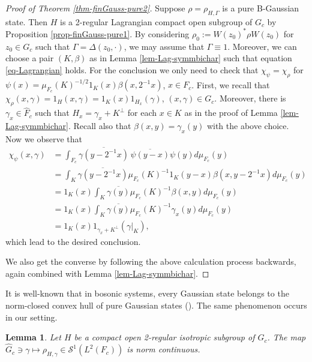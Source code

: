 \documentclass[12pt,reqno]{amsart}
\newtheorem{lem}[thm]{Lemma}
\theoremstyle{definition}
\theoremstyle{definition}
\theoremstyle{definition}
\numberwithin{thm}{section}
\numberwithin{equation}{section}
\newcommand{\mc}[1]{\mathcal #1}
\newcommand{\wh}[1]{\widehat{#1}}
\begin{document}
\begin{proof}[Proof of Theorem \ref{thm-finGauss-pure2}]
Suppose $\rho=\rho_{H,\Gamma}$ is a pure B-Gaussian state. Then $H$ is a 2-regular Lagrangian compact open subgroup of $G_c$ by Proposition \ref{prop-finGauss-pure1}. By considering $\rho_0:=W(z_0)^*\rho W(z_0)$ for $z_0\in G_c$ such that $\Gamma=\Delta(z_0,\cdot)$, we may assume that $\Gamma\equiv 1$. Moreover, we can choose a pair $(K,\beta)$ as in Lemma \ref{lem-Lag-symmbichar} such that equation \eqref{eq-Lagrangian} holds.
For the conclusion we only need to check that $\chi_{\psi} = \chi_\rho$ for $\psi(x) = \mu_{F_c}(K)^{-1/2}1_K(x)\beta(x,2^{-1}x)$, $x\in F_c$.
First, we recall that $\chi_\rho(x,\gamma)=1_H(x,\gamma)=1_K(x)1_{H_x}(\gamma)$, $(x,\gamma) \in G_c$. Moreover, there is $\gamma_x \in \wh{F}_c$ such that $H_x = \gamma_x+K^{\perp}$ for each $x\in K$ as in the proof of Lemma \ref{lem-Lag-symmbichar}. Recall also that $\beta(x,y) = \gamma_x(y)$ with the above choice.
Now we observe that
    \begin{align*}
        \chi_{\psi}(x,\gamma)
        & = \int_{F_c} \overline{\gamma(y - 2^{-1}x)}\,\overline{\psi(y-x)}\psi(y)d\mu_{F_c}(y)\\
        & = \int_K \overline{\gamma(y - 2^{-1}x)}\mu_{F_c}(K)^{-1}1_K(y-x)\beta(x, y-2^{-1}x)d\mu_{F_c}(y)\\
        & = 1_K(x)\int_K \overline{\gamma(y)}\mu_{F_c}(K)^{-1}\beta(x, y)d\mu_{F_c}(y)\\
        & = 1_K(x) \int_K \overline{\gamma(y)}\mu_{F_c}(K)^{-1}\gamma_x(y)d\mu_{F_c}(y)\\
        &= 1_K(x) 1_{\gamma_x + K^{\perp}}(\gamma|_K),
    \end{align*}
which lead to the desired conclusion.

We also get the converse by following the above calculation process backwards, again combined with Lemma \ref{lem-Lag-symmbichar}.
\end{proof}


It is well-known that in bosonic systems, every Gaussian state belongs to the norm-closed convex hull of pure Gaussian states (\cite[Problem 5.10]{Serafini}). The same phenomenon occurs in our setting.

\begin{lem}\label{lem-normconvint} Let $H$ be a compact open 2-regular isotropic subgroup of $G_c$. The map $\wh{G}_c\ni\gamma\mapsto\rho_{H,\gamma}\in\mc{S}^1(L^2(F_c))$ is norm continuous.
\end{lem}
\end{document}
